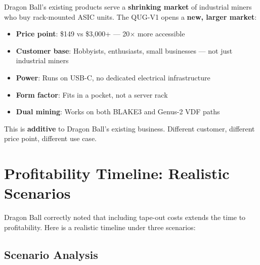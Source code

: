 \documentclass[11pt,a4paper]{article}
\begin{document}
\begin{highlight}
Dragon Ball's existing products serve a \textbf{shrinking market} of industrial miners who buy rack-mounted ASIC units. The QUG-V1 opens a \textbf{new, larger market}:

\begin{itemize}[leftmargin=1.5em]
    \item \textbf{Price point}: \$149 vs \$3,000+ --- 20$\times$ more accessible
    \item \textbf{Customer base}: Hobbyists, enthusiasts, small businesses --- not just industrial miners
    \item \textbf{Power}: Runs on USB-C, no dedicated electrical infrastructure
    \item \textbf{Form factor}: Fits in a pocket, not a server rack
    \item \textbf{Dual mining}: Works on both BLAKE3 and Genus-2 VDF paths
\end{itemize}

This is \textbf{additive} to Dragon Ball's existing business. Different customer, different price point, different use case.
\end{highlight}


\section{Profitability Timeline: Realistic Scenarios}

Dragon Ball correctly noted that including tape-out costs extends the time to profitability. Here is a realistic timeline under three scenarios:

\subsection{Scenario Analysis}
\end{document}

